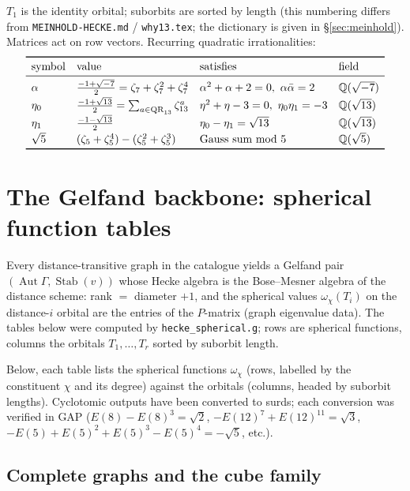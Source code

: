 \documentclass[11pt]{article}
\theoremstyle{remark}
\newcommand{\Q}{\mathbb{Q}}
\newcommand{\T}[1]{T_{#1}}
\begin{document}
$\T1$ is the identity orbital; suborbits are sorted by length (this
numbering differs from \texttt{MEINHOLD-HECKE.md} / \texttt{why13.tex};
the dictionary is given in \S\ref{sec:meinhold}). Matrices act on row
vectors. Recurring quadratic irrationalities:
\[
\begin{array}{llll}
\toprule
\text{symbol} & \text{value} & \text{satisfies} & \text{field}\\
\midrule
\alpha & \tfrac{-1+\sqrt{-7}}{2} = \zeta_7+\zeta_7^2+\zeta_7^4
       & \alpha^2+\alpha+2=0,\ \alpha\bar\alpha=2 & \Q(\sqrt{-7})\\[2pt]
\eta_0 & \tfrac{-1+\sqrt{13}}{2} = \textstyle\sum_{a\in\mathrm{QR}_{13}}\zeta_{13}^a
       & \eta^2+\eta-3=0,\ \eta_0\eta_1=-3 & \Q(\sqrt{13})\\[2pt]
\eta_1 & \tfrac{-1-\sqrt{13}}{2} & \eta_0-\eta_1=\sqrt{13} & \Q(\sqrt{13})\\[2pt]
\sqrt5 & (\zeta_5+\zeta_5^4)-(\zeta_5^2+\zeta_5^3) & \text{Gauss sum mod }5 & \Q(\sqrt5)\\
\bottomrule
\end{array}
\]

\section{The Gelfand backbone: spherical function tables}\label{sec:gelfand}

Every distance-transitive graph in the catalogue yields a Gelfand pair
$(\operatorname{Aut}\Gamma, \operatorname{Stab}(v))$ whose Hecke algebra is
the Bose--Mesner algebra of the distance scheme: rank $=$ diameter $+1$,
and the spherical values $\omega_\chi(\T i)$ on the distance-$i$ orbital
are the entries of the $P$-matrix (graph eigenvalue data). The tables below
were computed by \texttt{hecke\_spherical.g}; rows are spherical functions,
columns the orbitals $\T1,\dots,\T r$ sorted by suborbit length.

Below, each table lists the spherical functions $\omega_\chi$ (rows,
labelled by the constituent $\chi$ and its degree) against the orbitals
(columns, headed by suborbit lengths). Cyclotomic outputs have been
converted to surds; each conversion was verified in GAP
($E(8)-E(8)^3=\sqrt2$, $-E(12)^7+E(12)^{11}=\sqrt3$,
$-E(5)+E(5)^2+E(5)^3-E(5)^4=-\sqrt5$, etc.).

\subsection{Complete graphs and the cube family}
\end{document}
